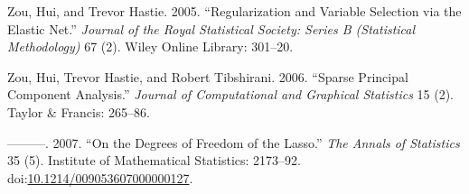 \documentclass[article]{jss}
\begin{document}
\hypertarget{ref-zou2005regularization}{}
Zou, Hui, and Trevor Hastie. 2005. ``Regularization and Variable
Selection via the Elastic Net.'' \emph{Journal of the Royal Statistical
Society: Series B (Statistical Methodology)} 67 (2). Wiley Online
Library: 301--20.

\hypertarget{ref-zou2006sparse}{}
Zou, Hui, Trevor Hastie, and Robert Tibshirani. 2006. ``Sparse Principal
Component Analysis.'' \emph{Journal of Computational and Graphical
Statistics} 15 (2). Taylor \& Francis: 265--86.

\hypertarget{ref-Zou2007}{}
---------. 2007. ``On the Degrees of Freedom of the Lasso.'' \emph{The
Annals of Statistics} 35 (5). Institute of Mathematical Statistics:
2173--92.
doi:\href{https://doi.org/10.1214/009053607000000127}{10.1214/009053607000000127}.
\end{document}
